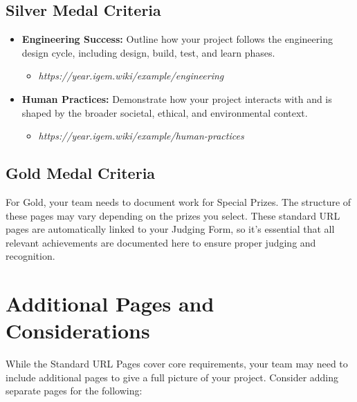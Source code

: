 \subsection*{Silver Medal Criteria} 
\begin{itemize}
    \item \textbf{Engineering Success:} Outline how your project follows the engineering design cycle, including design, build, test, and learn phases.
    \begin{itemize}
        \item  \textit{https://year.igem.wiki/example/engineering}
    \end{itemize}
    \item \textbf{Human Practices:} Demonstrate how your project interacts with and is shaped by the broader societal, ethical, and environmental context.
    \begin{itemize}
        \item  \textit{https://year.igem.wiki/example/human-practices}
    \end{itemize}
\end{itemize}

\subsection*{Gold Medal Criteria} 
For Gold, your team needs to document work for Special Prizes.
The structure of these pages may vary depending on the prizes you select. \newline
These standard URL pages are automatically linked to your Judging Form, so it’s essential that all relevant achievements are documented here to ensure proper judging and recognition.


\section{Additional Pages and Considerations}

While the Standard URL Pages cover core requirements, your team may need to include additional pages to give a full picture of your project.
Consider adding separate pages for the following:

